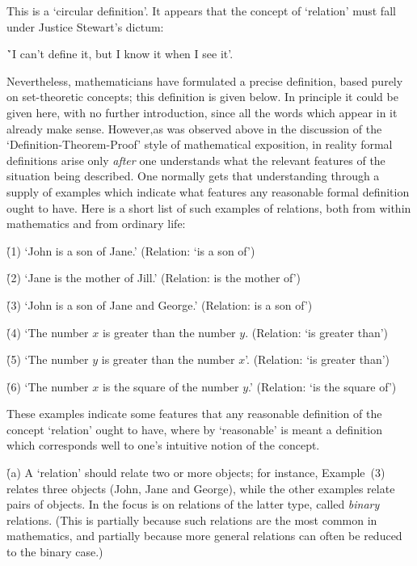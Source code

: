{\noindent This is a `circular definition'. It appears that the concept of `relation' must fall under Justice Stewart's dictum:

        \h `I can't define it, but I know it when I see it'.

\V

        Nevertheless, mathematicians have formulated a precise definition, based purely on set-theoretic concepts; this definition is given below.
    In principle it could be given here, with no further introduction, since all the words which appear in it already make sense.
    However,as was observed above in the discussion of the `Definition-Theorem-Proof' style of mathematical exposition,
    in reality formal definitions arise only {\em after} one understands what the relevant features of the situation being described.
    One normally gets that understanding through a supply of examples which indicate what features any reasonable formal definition ought to have.
    Here is a short list of such examples of relations, both from within mathematics and from ordinary life:

\V

       \h (1) `John is a son of Jane.' (Relation: `is a son of')

\VA

       \h (2) `Jane is the mother of Jill.' (Relation: is the mother of')

\VA

       \h (3) `John is a son of Jane and George.' (Relation: is a son of')

\VA

       \h (4) `The number $x$ is greater than the number $y$. (Relation: `is greater than')

\VA

       \h (5) `The number $y$ is greater than the number $x$'. (Relation: `is greater than')

\VA

       \h (6) `The number $x$ is the square of the number $y$.' (Relation: `is the square of')



\VA

        These examples indicate some features that any reasonable definition of the concept `relation' ought to have,
    where by `reasonable' is meant a definition which corresponds well to one's intuitive notion of the concept.

        \h (a) A `relation' should relate two or more objects; for instance, Example~(3) relates three objects (John, Jane and George),
    while the other examples relate pairs of objects. In {\TheseNotes} the focus is on relations of the latter type, called {\em binary} relations.
    (This is partially because such relations are the most common in mathematics,
    and partially because more general relations can often be reduced to the binary case.)

}
